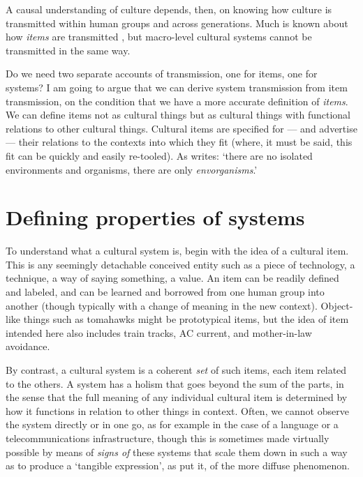A causal understanding of culture depends, then, on knowing how culture is transmitted within human groups and across 
generations. Much is known about how \textit{items} are transmitted 
\citep{rogers_diffusion_2003}, but macro-level cultural systems cannot be 
transmitted in the same way. 



Do we need two separate accounts of transmission, one for items, one for 
systems? I am going to argue that we can derive system transmission from 
item transmission, on the condition that we have a more accurate 
definition of \textit{items}. We can define items not as cultural things but as 
cultural things with functional relations to other cultural things. 
Cultural items are specified for --- and advertise --- their relations to the 
contexts into which they fit (where, it must be said, this fit can be 
quickly and easily re-tooled). As \citet[19]{kockelman_agent_2013} writes: \textquoteleft there 
are no isolated environments and organisms, there are only \textit{envorganisms}.' 

\section{Defining properties of systems}

To understand what a cultural system is, begin with the idea of a cultural item. This is any seemingly detachable conceived entity such 
as a piece of technology, a technique, a way of saying something, a 
value. An item can be readily defined and labeled, and can be learned 
and borrowed from one human group into another (though typically with 
a change of meaning in the new context). Object-like 
things such as tomahawks might be prototypical items, but the idea of 
item intended here also includes train tracks, AC current, and 
mother-in-law avoidance. 



By contrast, a cultural system is a coherent \textit{set} of such items, each 
item related to the others. A system has a holism that goes 
beyond the sum of the parts, in the sense that the full meaning of any 
individual cultural item is determined by how it functions in relation to other things in context. Often, we cannot observe the system directly or in one go, as for 
example in the case of a language or a telecommunications 
infrastructure, though this is sometimes made virtually possible by 
means of \textit{signs of} these systems that scale them down in such 
a way as to produce a \textquoteleft tangible expression', as \citet[208]{durkheim_elementary_1912} put it, of the more diffuse phenomenon. 



